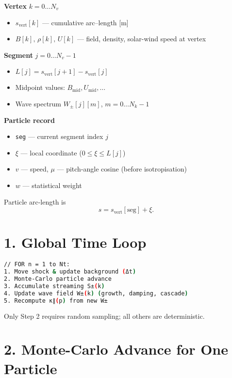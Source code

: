 \begin{tcolorbox}[colback=gray!10]
\textbf{Vertex} $k = 0 \dots N_v$
\begin{itemize}
  \item $s_{\text{vert}}[k]$ — cumulative arc–length [m]
  \item $B[k],\, \rho[k],\, U[k]$ — field, density, solar-wind speed at vertex
\end{itemize}

\textbf{Segment} $j = 0 \dots N_v-1$
\begin{itemize}
  \item $L[j] = s_{\text{vert}}[j+1] - s_{\text{vert}}[j]$
  \item Midpoint values: $B_{\text{mid}}, U_{\text{mid}}, \dots$
  \item Wave spectrum $W_\pm[j][m]$, $m = 0 \dots N_k - 1$
\end{itemize}

\textbf{Particle record}
\begin{itemize}
  \item \texttt{seg} — current segment index $j$
  \item $\xi$ — local coordinate ($0 \le \xi \le L[j]$)
  \item $v$ — speed, $\mu$ — pitch-angle cosine (before isotropisation)
  \item $w$ — statistical weight
\end{itemize}
\end{tcolorbox}

Particle arc-length is
\[
s = s_{\text{vert}}[\text{seg}] + \xi.
\]

\section*{1. Global Time Loop}

\begin{lstlisting}[language=bash,basicstyle=\ttfamily\small]
// FOR n = 1 to Nt:
1. Move shock & update background (Δt)
2. Monte-Carlo particle advance
3. Accumulate streaming S±(k)
4. Update wave field W±(k) (growth, damping, cascade)
5. Recompute κ∥(p) from new W±
\end{lstlisting}

Only Step 2 requires random sampling; all others are deterministic.

\section*{2. Monte-Carlo Advance for One Particle}

